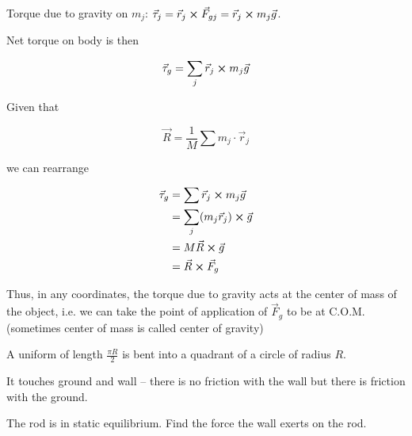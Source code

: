 \begin{sol}
	Torque due to gravity on $m_j$: $\vec\tau_j = \vec r_j \cross \vec F_{gj} = \vec r_j \cross m_j \vec g$.

	Net torque on body is then

	\begin{equation}
		\vec \tau_g = \sum_j \vec r_j \cross m_j \vec g
	\end{equation}

	Given that

	\begin{equation}
		\vec R = \frac{1}{M} \sum m_j \cdot \vec r_j
	\end{equation}

	we can rearrange

	\begin{align}
		\vec \tau_g &= \sum \vec r_j \cross m_j \vec g\\
		&= \sum_j (m_j \vec r_j) \cross \vec g\\
		&= M\vec R \cross \vec g\\
		&= \vec R \cross \vec F_g
	\end{align}

	Thus, in any coordinates, the torque due to gravity acts at the center of mass of the object, i.e. we can take the point of application of $\vec F_g$ to be at C.O.M. (sometimes center of mass is called center of gravity)
\end{sol}

\begin{example}
	A uniform of length $\frac{\pi R}{2}$ is bent into a quadrant of a circle of radius $R$.

	It touches ground and wall -- there is no friction with the wall but there is friction with the ground. 

	The rod is in static equilibrium. Find the force the wall exerts on the rod.
\end{example}

